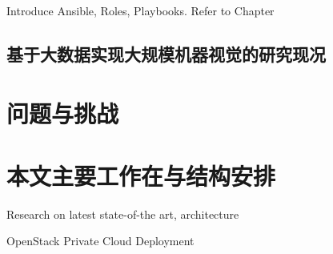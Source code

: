 Introduce Ansible, Roles, Playbooks. Refer to Chapter

\subsection{基于大数据实现大规模机器视觉的研究现况}
\label{subsec:bigdata_cv_background}

\section{问题与挑战}
\label{sec:challenges}

\section{本文主要工作在与结构安排}
\label{sec:main_work}

Research on latest state-of-the art, architecture

OpenStack Private Cloud Deployment


